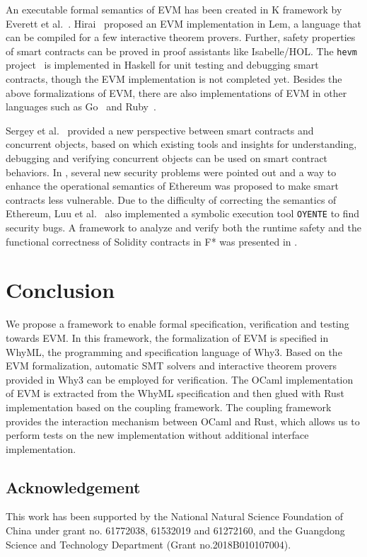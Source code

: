 \documentclass[runningheads]{llncs}
\begin{document}
An executable formal semantics of EVM has been created in K framework by Everett et al.~\cite{hildenbrandt2017kevm}. Hirai~\cite{hirai2017defining} proposed an EVM implementation in Lem, a language that can be compiled for a few interactive theorem provers. Further, safety properties of smart contracts can be proved in proof assistants like Isabelle/HOL. The \texttt{hevm} project~\cite{hevm} is implemented in Haskell for unit testing and debugging smart contracts, though the EVM implementation is not completed yet. Besides the above formalizations of EVM, there are also implementations of EVM in other languages such as %
Go~\cite{vmgo} and Ruby~\cite{cryptape}.

Sergey et al.~\cite{sergey2017concurrent} provided a new perspective between smart contracts and concurrent objects, based on which existing tools and insights for understanding, debugging and verifying concurrent objects can be used on smart contract behaviors. In \cite{luu2016making}, several new security problems were pointed out and a way to enhance the operational semantics of Ethereum was proposed to make smart contracts less vulnerable. Due to the difficulty of correcting the semantics of Ethereum, Luu et al.~\cite{luu2016making} also implemented a symbolic execution tool \texttt{OYENTE} to find security bugs. A framework to analyze and verify both the runtime safety and the functional correctness of Solidity contracts in F* was presented in \cite{bhargavan2016formal}.

\section{Conclusion}\label{Sec: Conclusion}
We propose a framework to enable formal specification, verification and testing towards EVM. In this framework, the formalization of EVM is specified in WhyML, the programming and specification language of Why3. Based on the EVM formalization, automatic SMT solvers and interactive theorem provers provided in Why3 can be employed for verification. The OCaml implementation of EVM is extracted from the WhyML specification and then glued with Rust implementation based on the coupling framework. The coupling framework provides the interaction mechanism between OCaml and Rust, which allows us to perform tests on the new implementation without additional interface implementation.

\subsection*{Acknowledgement}
\noindent This work has been supported by the National Natural Science Foundation of China under grant no. 61772038, 61532019 and 61272160, and the Guangdong Science and Technology Department (Grant no.2018B010107004).




\end{document}
